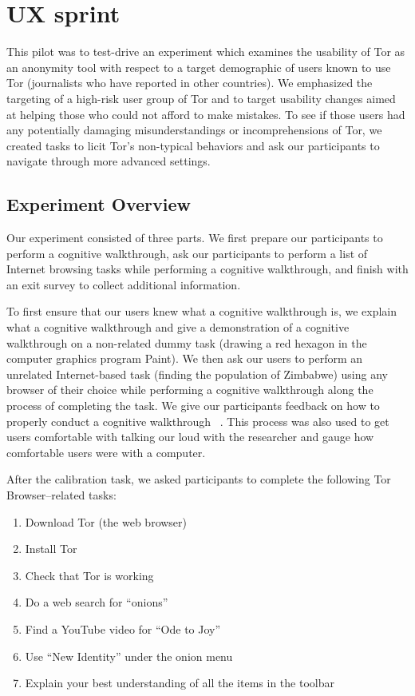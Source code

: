 \documentclass[letterpaper,twocolumn,11pt]{article}
\begin{document}
\appendix

\section{UX sprint}
\label{sec:pilot}
\indent \indent This pilot was to test-drive an experiment which examines the usability of Tor as an anonymity tool
with respect to a target demographic of users known to use Tor (journalists who have reported in other
countries). We emphasized the targeting of a high-risk user group of Tor and to 
target usability changes aimed at helping those who could not afford to make mistakes. To see 
if those users had any potentially damaging misunderstandings or incomprehensions of Tor, 
we created tasks to licit Tor's non-typical behaviors and ask our participants to
navigate through more advanced settings. 

\subsection{Experiment Overview}
\indent \indent Our experiment consisted of three parts. We first prepare our participants to perform a 
cognitive walkthrough, ask our participants to perform a list of Internet browsing 
tasks while performing a cognitive walkthrough, and finish with an exit survey to collect 
additional information. 

To first ensure that our users knew what a cognitive walkthrough is, we explain what a cognitive
walkthrough and give a demonstration of a cognitive walkthrough on a non-related dummy task 
(drawing a red hexagon in the computer graphics program Paint). We then ask our users to perform
an unrelated Internet-based task (finding the population of Zimbabwe) using any browser of their choice
while performing a cognitive walkthrough along the process of completing the task. We give our 
participants feedback on how to properly conduct a cognitive walkthrough ~\cite{wharton1994cognitive}.
This process was also used to get users comfortable with talking our loud with the researcher and gauge 
how comfortable users were with a computer.

After the calibration task, we asked participants to complete
the following Tor Browser--related tasks: 

\begin{enumerate} \itemsep1pt \parskip0pt 
\item Download Tor (the web browser)
\item Install Tor
\item Check that Tor is working
\item Do a web search for ``onions''
\item Find a YouTube video for ``Ode to Joy''
\item Use ``New Identity'' under the onion menu
\item Explain your best understanding of all the items in the toolbar
\end{enumerate}
\end{document}
